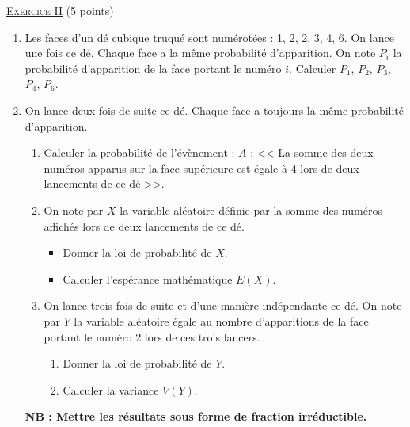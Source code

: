 \noindent \underline{\textsc{Exercice II}} (5 points) 
      \begin{enumerate}
            \item Les faces d'un d\'e cubique truqu\'e sont num\'erot\'ees : 1, 2, 2, 3, 4, 6.
                  On lance une fois ce d\'e. 
                  Chaque face a la m\^eme probabilit\'e d'apparition.
                  On note $P_i$ la probabilit\'e d'apparition de la face portant le num\'ero $i$. 
                  Calculer $P_1$, $P_2$, $P_3$, $P_4$, $P_6$.
            \item On lance deux fois de suite ce d\'e. 
                  Chaque face a toujours la m\^eme probabilit\'e d'apparition.
                  \begin{enumerate}
                        \item Calculer la probabilit\'e de l'\'ev\`enement :
                              $A$ : << La somme des deux num\'eros apparus sur la face sup\'erieure est \'egale \`a 4
                                    lors de deux lancements de ce d\'e >>.
                        \item On note par $X$ la variable al\'eatoire d\'efinie par la somme des num\'eros affich\'es 
                              lors de deux lancements de ce d\'e.
                              \begin{itemize}
                                    \item Donner la loi de probabilit\'e de $X$.
                                    \item Calculer l'esp\'erance math\'ematique $E(X)$.
                              \end{itemize}
                        \item On lance trois fois de suite et d'une mani\`ere ind\'ependante ce d\'e.
                              On note par $Y$ la variable al\'eatoire \'egale au nombre d'apparitions de la face portant
                              le num\'ero 2 lors de ces trois lancers.
                              \begin{enumerate}
                                    \item Donner la loi de probabilit\'e de $Y$.
                                    \item Calculer la variance $V(Y)$.
                              \end{enumerate}
                  \end{enumerate}
            \textbf{NB : Mettre les r\'esultats sous forme de fraction irr\'eductible.}
      \end{enumerate}

